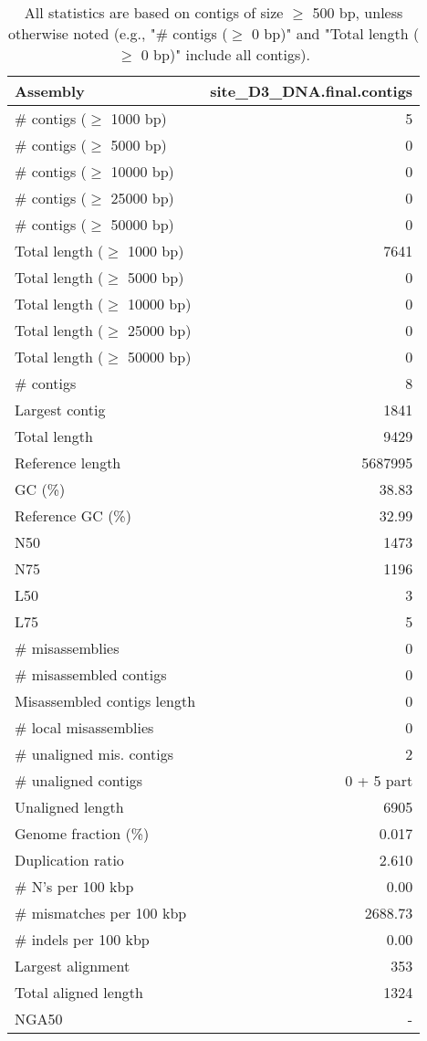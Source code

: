 \documentclass[12pt,a4paper]{article}
\begin{document}
\begin{table}[ht]
\begin{center}
\caption{All statistics are based on contigs of size $\geq$ 500 bp, unless otherwise noted (e.g., "\# contigs ($\geq$ 0 bp)" and "Total length ($\geq$ 0 bp)" include all contigs).}
\begin{tabular}{|l*{1}{|r}|}
\hline
Assembly & site\_D3\_DNA.final.contigs \\ \hline
\# contigs ($\geq$ 1000 bp) & 5 \\ \hline
\# contigs ($\geq$ 5000 bp) & 0 \\ \hline
\# contigs ($\geq$ 10000 bp) & 0 \\ \hline
\# contigs ($\geq$ 25000 bp) & 0 \\ \hline
\# contigs ($\geq$ 50000 bp) & 0 \\ \hline
Total length ($\geq$ 1000 bp) & 7641 \\ \hline
Total length ($\geq$ 5000 bp) & 0 \\ \hline
Total length ($\geq$ 10000 bp) & 0 \\ \hline
Total length ($\geq$ 25000 bp) & 0 \\ \hline
Total length ($\geq$ 50000 bp) & 0 \\ \hline
\# contigs & 8 \\ \hline
Largest contig & 1841 \\ \hline
Total length & 9429 \\ \hline
Reference length & 5687995 \\ \hline
GC (\%) & 38.83 \\ \hline
Reference GC (\%) & 32.99 \\ \hline
N50 & 1473 \\ \hline
N75 & 1196 \\ \hline
L50 & 3 \\ \hline
L75 & 5 \\ \hline
\# misassemblies & 0 \\ \hline
\# misassembled contigs & 0 \\ \hline
Misassembled contigs length & 0 \\ \hline
\# local misassemblies & 0 \\ \hline
\# unaligned mis. contigs & 2 \\ \hline
\# unaligned contigs & 0 + 5 part \\ \hline
Unaligned length & 6905 \\ \hline
Genome fraction (\%) & 0.017 \\ \hline
Duplication ratio & 2.610 \\ \hline
\# N's per 100 kbp & 0.00 \\ \hline
\# mismatches per 100 kbp & 2688.73 \\ \hline
\# indels per 100 kbp & 0.00 \\ \hline
Largest alignment & 353 \\ \hline
Total aligned length & 1324 \\ \hline
NGA50 & - \\ \hline
\end{tabular}
\end{center}
\end{table}
\end{document}

